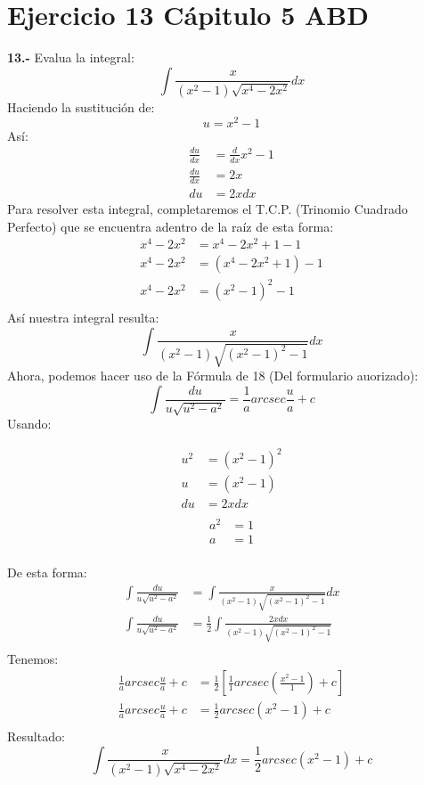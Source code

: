 \chapter*{Ejercicio 13 Cápitulo 5 ABD }

\textbf{13.-} Evalua la integral:
\[
\int \frac{x}{(x^{2}-1)\sqrt{x^{4}-2x^{2}}}dx
\]
Haciendo la sustitución de:
\[
u = x^{2}-1
\]
Así:
\begin{align*}
\frac{du}{dx} &= \frac{d}{dx}x^{2}-1 \\
\frac{du}{dx} &= 2x \\
du &= 2xdx  
\end{align*}
\newline
Para resolver esta integral, completaremos el T.C.P. (Trinomio Cuadrado Perfecto) que se encuentra adentro de la raíz de esta forma:
\begin{align*}
x^{4}-2x^{2} &= x^{4}-2x^{2} + 1 -1 \\
x^{4}-2x^{2} &= (x^{4}-2x^{2} + 1) -1 \\
x^{4}-2x^{2} &= (x^{2}-1)^{2}-1 \\
\end{align*}
Así nuestra integral resulta:
\[
\int \frac{x}{(x^{2}-1)\sqrt{(x^{2}-1)^{2}-1}}dx
\]
Ahora, podemos hacer uso de la Fórmula de 18 (Del formulario auorizado):
\[
\int \frac{du}{u\sqrt{u^{2}-a^{2}}} = \frac{1}{a}arcsec\frac{u}{a} + c
\]
Usando:
\begin{multicols}{2}
	\noindent
	\begin{align*}
		u^{2} &= (x^{2}-1)^{2} \\
        u  &= (x^{2}-1) \\
        du &= 2xdx \\
	\end{align*}
	\columnbreak
	\begin{align*}
		a^{2} &= 1 \\
        a &= 1 \\
	\end{align*}
\end{multicols}

De esta forma:
\begin{align*}
\int \frac{du}{u\sqrt{u^{2}-a^{2}}} &=   \int \frac{x}{(x^{2}-1)\sqrt{(x^{2}-1)^{2}-1}}dx \\
\int \frac{du}{u\sqrt{u^{2}-a^{2}}} &=   \frac{1}{2}\int \frac{2xdx}{(x^{2}-1)\sqrt{(x^{2}-1)^{2}-1}} \\
\end{align*}
Tenemos:
\begin{align*}
\frac{1}{a}arcsec\frac{u}{a} + c &=   \frac{1}{2}[\frac{1}{1}arcsec(\frac{x^{2}-1}{1}) + c] \\
\frac{1}{a}arcsec\frac{u}{a} + c &=   \frac{1}{2}arcsec (x^{2}-1) + c \\
\end{align*}
Resultado:
\[
\int \frac{x}{(x^{2}-1)\sqrt{x^{4}-2x^{2}}}dx = \frac{1}{2}arcsec (x^{2}-1) + c
\]
